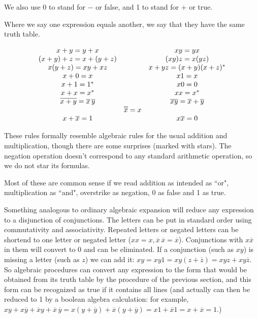\documentclass[12pt]{article}
\begin{document}
We also use 0 to stand for $-$ or false, and 1 to stand for $+$ or true.

Where we say one expression equals another, we say that they have the same truth table.

$$\begin{array}{c c c}
 x+y = y + x & & xy = yx \\

(x+y)+z = x+(y+z) & & (xy)z = x(yz) \\

x(y+z) = xy+xz &  & x+yz = (x+y)(x+z)^* \\

x+0 = x&   &x1 = x \\

x+1 = 1^*& & x0=0 \\

x+x = x^* &  &xx=x^* \\

\overline{x+y} = \overline x \,\overline y & & \overline{xy} = \overline x + \overline y \\

   & \overline{\overline{x}} = x & \\

x + \overline{x} = 1 &  &x\overline{x}=0 \\

\end{array}$$

These rules formally resemble algebraic rules for the usual addition and multiplication, though there are some surprises (marked with stars).
The negation operation doesn't correspond to any standard arithmetic operation, so we do not star its formulas.

Most of these are common sense if we read addition as intended as ``or", multiplication as ``and", overstrike as negation, 0 as false and 1 as true.

Something analogous to ordinary algebraic expansion will reduce any expression to a disjunction of conjunctions.   The letters can be put in standard order using
commutativity and associativity.  Repeated letters or negated letters can be shortend to one letter or negated letter ($xx=x, \overline x \,\overline x = \overline x$).  Conjunctions with $x\overline{x}$ in them will convert to 0 and can be eliminated.  If a conjunction (such as $xy$) is missing a letter
(such as $z$) we can add it:  $xy = xy1 = xy(z+\overline z) = xyz + xy\overline z$.  So algebraic procedures can convert any expression to the form
that would be obtained from its truth table by the procedure of the previous section, and this form can be recognized as true if it contains all lines (and actually can then be reduced to 1 by a boolean algebra calculation:  for example, $xy + x\overline y + \overline x y + \overline x\,\overline y = x(y + \overline y) + \overline x(y + \overline y) = x1 + \overline x 1 = x + \overline x = 1$.)
\end{document}

